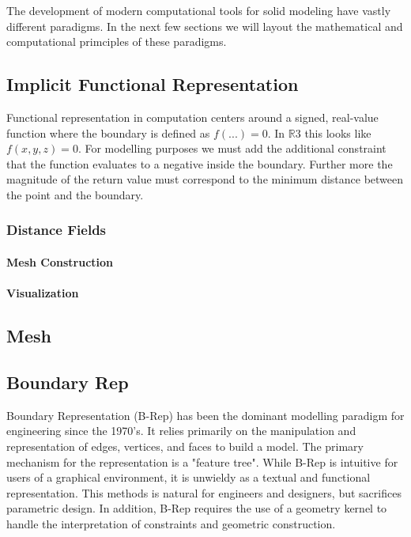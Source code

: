 \documentclass[a4paper]{article}
\begin{document}
The development of modern
computational tools for solid modeling have vastly different paradigms. In
the next few sections we will layout the mathematical and computational
primciples of these paradigms.

\subsection{Implicit Functional Representation}

Functional representation in computation centers around a signed, real-value
function where the boundary is defined as $f(...) = 0$.
In $\mathbb{R}3$ this looks like $f(x,y,z) = 0$. For modelling purposes we must add the
additional constraint that the function evaluates to a negative inside the
boundary. Further more the magnitude of the return value must correspond to
the minimum distance between the point and the boundary. \cite{Olah_2011}


\subsubsection{Distance Fields}

\cite{OpenVDB}

\paragraph{Mesh Construction}
\cite{Tzur}

\paragraph{Visualization}
\cite{Tupper_2001}

\subsection{Mesh}

\cite{Bischoff_Botsch_Steinberg_Bischoff_Kobbelt_Aachen_2002}

\subsection{Boundary Rep}
Boundary Representation (B-Rep) has been the dominant modelling paradigm
for engineering since the 1970's.
It relies primarily on the manipulation and representation of
edges, vertices, and faces to build a model.
The primary mechanism for the representation is a "feature tree".
While B-Rep is intuitive for users of a graphical environment,
it is unwieldy as a textual and functional representation.
This methods is natural for engineers and designers, but sacrifices
parametric design. In addition, B-Rep requires the use of a geometry kernel
to handle the interpretation of constraints and geometric construction. \cite{stroud2006boundary}
\end{document}
